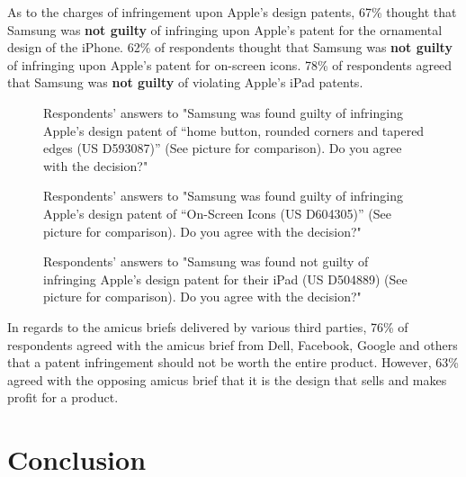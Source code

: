 \documentclass[prodmode,cs196]{acmlarge}
\begin{document}
As to the charges of infringement upon Apple's design patents, 67\% thought that Samsung was \textbf{not guilty} of infringing upon Apple's patent for the ornamental design of the iPhone. 62\% of respondents thought that Samsung was \textbf{not guilty} of infringing upon Apple's patent for on-screen icons. 78\% of respondents agreed that Samsung was \textbf{not guilty} of violating Apple's iPad patents.

\begin{figure}[h]
	\caption{Respondents' answers to "Samsung was found guilty of infringing Apple’s design patent of “home button, rounded corners and tapered edges (US D593087)” (See picture for comparison). Do you agree with the decision?"}
\end{figure}

\begin{figure}[h]
	\caption{Respondents' answers to "Samsung was found guilty of infringing Apple’s design patent of “On-Screen Icons  (US D604305)” (See picture for comparison). Do you agree with the decision?"}
\end{figure}

\begin{figure}[H]
	\caption{Respondents' answers to "Samsung was found not guilty of infringing Apple’s design patent for their iPad (US D504889) (See picture for comparison). Do you agree with the decision?"}
\end{figure}

In regards to the amicus briefs delivered by various third parties, 76\% of respondents agreed with the amicus brief from Dell, Facebook, Google and others that a patent infringement should not be worth the entire product. However, 63\% agreed with the opposing amicus brief that it is the design that sells and makes profit for a product.

\section{Conclusion}

\nocite{AppleiPhoneDesignPatent}

\label{sect:bib}

{}
\end{document}
